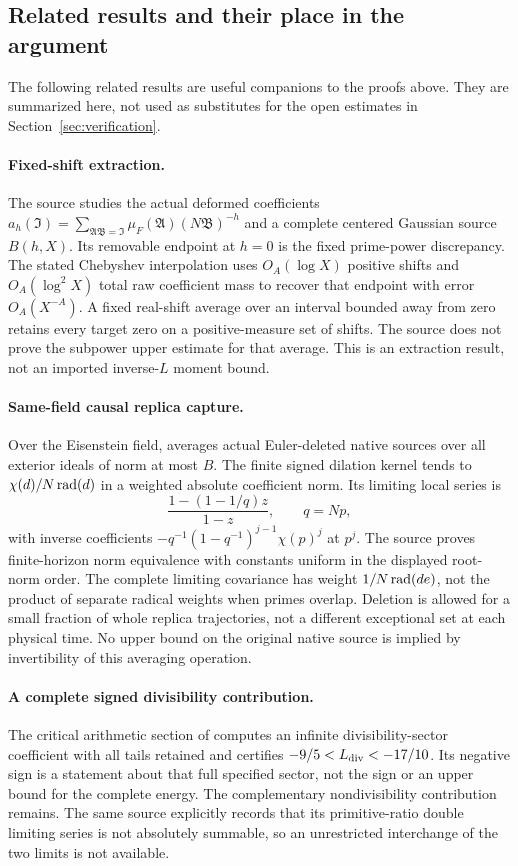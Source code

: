 \subsection{Related results and their place in the argument}
The following related results are useful companions to the proofs above. They are summarized here, not used as substitutes for the open estimates in Section~\ref{sec:verification}.

\paragraph{Fixed-shift extraction.}
The source \cite{R991} studies the actual deformed coefficients
$a_h(\mathfrak I)=\sum_{\mathfrak A\mathfrak B=\mathfrak I}\mu_F(\mathfrak A)(N\mathfrak B)^{-h}$ and a complete centered Gaussian source $B(h,X)$. Its removable endpoint at $h=0$ is the fixed prime-power discrepancy. The stated Chebyshev interpolation uses $O_A(\log X)$ positive shifts and $O_A(\log^2X)$ total raw coefficient mass to recover that endpoint with error $O_A(X^{-A})$. A fixed real-shift average over an interval bounded away from zero retains every target zero on a positive-measure set of shifts. The source does not prove the subpower upper estimate for that average. This is an extraction result, not an imported inverse-$L$ moment bound.

\paragraph{Same-field causal replica capture.}
Over the Eisenstein field, \cite{R998} averages actual Euler-deleted native sources over all exterior ideals of norm at most $B$. The finite signed dilation kernel tends to $\chi(d)/N\operatorname{rad}(d)$ in a weighted absolute coefficient norm. Its limiting local series is
\[
 \frac{1-(1-1/q)z}{1-z},\qquad q=Np,
\]
with inverse coefficients $-q^{-1}(1-q^{-1})^{j-1}\chi(p)^j$ at $p^j$. The source proves finite-horizon norm equivalence with constants uniform in the displayed root-norm order. The complete limiting covariance has weight $1/N\operatorname{rad}(de)$, not the product of separate radical weights when primes overlap. Deletion is allowed for a small fraction of whole replica trajectories, not a different exceptional set at each physical time. No upper bound on the original native source is implied by invertibility of this averaging operation.

\paragraph{A complete signed divisibility contribution.}
The critical arithmetic section of \cite{R994} computes an infinite divisibility-sector coefficient with all tails retained and certifies $-9/5<L_{\rm div}<-17/10$. Its negative sign is a statement about that full specified sector, not the sign or an upper bound for the complete energy. The complementary nondivisibility contribution remains. The same source explicitly records that its primitive-ratio double limiting series is not absolutely summable, so an unrestricted interchange of the two limits is not available.


